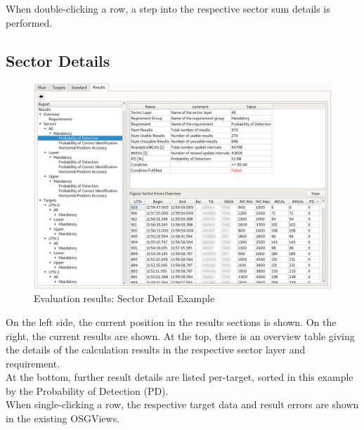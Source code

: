 When double-clicking a row, a step into the respective sector sum details is performed.

\subsection{Sector Details}

\begin{figure}[H]
  \hspace*{-2cm}
    \includegraphics[width=18cm,frame]{../screenshots/eval_results_sec_det_example.png}
  \caption{Evaluation results: Sector Detail Example}
\end{figure}

On the left side, the current position in the results sections is shown. On the right, the current results are shown. At the top, there is an overview table giving the details of the calculation results in the respective sector layer and requirement. \\

At the bottom, further result details are listed per-target, sorted in this example by the Probability of Detection (PD). \\

When single-clicking a row, the respective target data and result errors are shown in the existing OSGViews.

